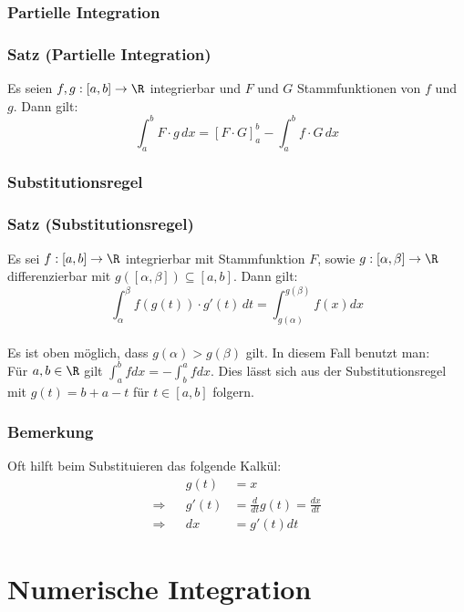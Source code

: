 \subsubsection{Partielle Integration}
%
\begin{frame}\frametitle{Satz (Partielle Integration)}
Es seien $f,g:[a,b] \to \R$ integrierbar und $F$ und $G$ Stammfunktionen von $f$ und $g$. Dann gilt:
$$
\int_a^b F\cdot g\, dx = [F \cdot G]_a^b - \int_a^b f \cdot G\, dx
$$
\end{frame}
%
\subsubsection{Substitutionsregel}
%
\begin{frame}\frametitle{Satz (Substitutionsregel)}
Es sei $f:[a,b] \to \R$ integrierbar mit Stammfunktion $F$, sowie $g:[\alpha,\beta] \to \R$ differenzierbar mit $g([\alpha,\beta])\subseteq [a,b]$. Dann gilt:
$$
\int_\alpha^\beta f(g(t))\cdot g'(t)\, dt = \int_{g(\alpha)}^{g(\beta)} f(x) dx
$$
\vfill
{}\\
Es ist oben möglich, dass $g(\alpha)>g(\beta)$ gilt. In diesem Fall benutzt man:\\
Für $a,b \in \R$ gilt $\int_a^b fdx = - \int_b^a fdx$. Dies lässt sich aus der Substitutionsregel mit $g(t)=b+a-t$ für $t \in [a,b]$ folgern.
\end{frame}
%
\begin{frame}\frametitle{Bemerkung}
Oft hilft beim Substituieren das folgende Kalkül:
\begin{align*}
&&g(t)&=x \\
 \Longrightarrow &&g'(t)&=\frac{d}{dt}g(t)=\frac{dx}{dt}\\  \Longrightarrow&& dx&=g'(t)dt
\end{align*}
\end{frame}
%

%
\section{Numerische Integration}
\makeSectionDividerPage
%
